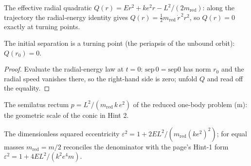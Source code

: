 \begin{definition}
\label{def:IPhO2026Problems_problem_IPhO_2026_1_B_2:turningQuadratic}
The effective radial quadratic
$Q(r) = E r^2 + k e^2 r - L^2/(2 m_{\mathrm{red}})$: along the trajectory
the radial-energy identity gives
$Q(r) = \tfrac{1}{2} m_{\mathrm{red}}\, \dot r^{\,2} r^2$, so $Q(r) = 0$
exactly at turning points.
\end{definition}

\begin{lemma}
\label{lem:IPhO2026Problems_problem_IPhO_2026_1_B_2:turningQuadratic_periapsis}
The initial separation is a turning point (the periapsis of the unbound
orbit): $Q(r_0) = 0$.
\end{lemma}
\begin{proof}
Evaluate the radial-energy law at $t = 0$: $\mathrm{sep}\,0 = \mathrm{sep0}$
has norm $r_0$ and the radial speed vanishes there, so the right-hand side
is zero; unfold $Q$ and read off the equality.
\end{proof}

\begin{definition}
\label{def:IPhO2026Problems_problem_IPhO_2026_1_B_2:semilatusRectum}
The semilatus rectum $p = L^2/(m_{\mathrm{red}}\,k\,e^2)$ of the reduced
one-body problem (m): the geometric scale of the conic in Hint 2.
\end{definition}

\begin{definition}
\label{def:IPhO2026Problems_problem_IPhO_2026_1_B_2:eccentricitySq}
The dimensionless squared eccentricity
$\varepsilon^2 = 1 + 2 E L^2/(m_{\mathrm{red}} (k e^2)^2)$; for equal
masses $m_{\mathrm{red}} = m/2$ reconciles the denominator with the page's
Hint-1 form $\varepsilon^2 = 1 + 4 E L^2/(k^2 e^4 m)$.
\end{definition}

